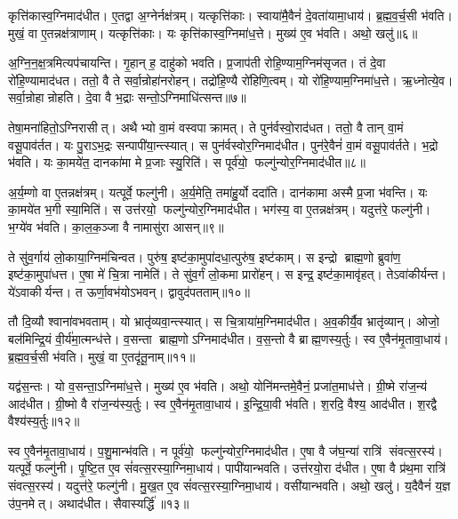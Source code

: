 कृत्ति॑कास्व॒ग्निमाद॑धीत। ए॒तद्वा अ॒ग्नेर्नक्ष॑त्रम्। यत्कृत्ति॑काः। स्वाया॑मै॒वैनं॑ दे॒वता॑यामा॒धाय॑। ब्र॒ह्म॒व॒र्च॒सी भ॑वति। मुखं॒ वा ए॒तन्नक्ष॑त्राणाम्। यत्कृत्ति॑काः। यः कृत्ति॑कास्व॒ग्निमा॑ध॒त्ते। मुख्य॑ ए॒व भ॑वति। अथो॒ खलु॑॥६॥

अ॒ग्नि॒न॒क्ष॒त्रमित्यप॑चायन्ति। गृ॒हान् ह॒ दाहु॑को भवति। प्र॒जाप॑ती रोहि॒ण्याम॒ग्निम॑सृजत। तं दे॒वा रो॑हि॒ण्यामाद॑धत। ततो॒ वै ते सर्वा॒न्रोहा॑नरोहन्। तद्रो॑हि॒ण्यै रो॑हिणि॒त्वम्। यो रो॑हि॒ण्याम॒ग्निमा॑ध॒त्ते। ऋ॒ध्नोत्ये॒व। सर्वा॒न्रोहान्रोहति। दे॒वा वै भ॒द्राः सन्तो॒ऽग्निमाधि॑त्सन्त॥७॥

तेषा॒मना॑हितो॒ऽग्निरासीत्। अथैभ्यो वा॒मं वस्वपाक्रामत्। ते पुन॑र्वस्वो॒राद॑धत। ततो॒ वै तान् वा॒मं वसू॒पाव॑र्तत। यः पु॒राऽभ॒द्रः सन्पापी॑या॒न्त्स्यात्। स पुन॑र्वस्वोर॒ग्निमाद॑धीत। पुन॑रे॒वैनं॑ वा॒मं वसू॒पाव॑र्तते। भ॒द्रो भ॑वति। यः का॒मये॑त॒ दानका॑मा मे प्र॒जाः स्यु॒रिति॑। स पूर्व॑यो॒ फल्गु॑न्योर॒ग्निमाद॑धीत॥८॥

अ॒र्य॒म्णो वा ए॒तन्नक्ष॑त्रम्। यत्पूर्वे॒ फल्गु॑नी। अ॒र्य॒मेति॒ तमा॑हु॒र्यो ददा॑ति। दान॑कामा अस्मै प्र॒जा भ॑वन्ति। यः का॒मये॑त भ॒गी स्या॒मिति॑। स उत्त॑रयो॒ फल्गु॑न्योर॒ग्निमाद॑धीत। भग॑स्य॒ वा ए॒तन्नक्ष॑त्रम्। यदुत्त॑रे॒ फल्गु॑नी। भ॒ग्ये॑व भ॑वति। का॒ल॒क॒ञ्जा वै नामासु॑रा आसन्॥९॥

ते सु॑व॒र्गाय॑ लो॒काया॒ग्निम॑चिन्वत। पुरु॑ष॒ इष्ट॑का॒मुपा॑दधा॒त्पुरु॑ष॒ इष्ट॑काम्। स इन्द्रो ब्राह्म॒णो ब्रुवा॑ण॒ इष्ट॑का॒मुपा॑धत्त। ए॒षा मे॑ चि॒त्रा नामेति॑। ते सु॑व॒र्गं लो॒कमा प्रारो॑हन्। स इन्द्र॒ इष्ट॑का॒मावृ॑हत्। तेऽवा॑कीर्यन्त। ये॑ऽवाकीर्यन्त। त ऊर्णा॒वभ॑योऽभवन्। द्वावुद॑पतताम्॥१०॥

तौ दि॒व्यौ श्वाना॑वभवताम्। यो भ्रातृ॑व्यवा॒न्त्स्यात्। स चि॒त्राया॑म॒ग्निमाद॑धीत। अ॒व॒कीर्यै॒व भ्रातृ॑व्यान्। ओजो॒ बल॑मिन्द्रि॒यं वी॒र्य॑मा॒त्मन्ध॑त्ते। व॒सन्ता ब्राह्म॒णोऽग्निमाद॑धीत। व॒स॒न्तो वै ब्राह्म॒णस्य॒र्तुः। स्व ए॒वैन॑मृ॒तावा॒धाय॑। ब्र॒ह्म॒व॒र्च॒सी भ॑वति। मुखं॒ वा ए॒तदृ॑तू॒नाम्॥११॥

यद्व॑स॒न्तः। यो व॒सन्ता॒ऽग्निमा॑ध॒त्ते। मुख्य॑ ए॒व भ॑वति। अथो॒ योनि॑मन्तमे॒वैनं॒ प्रजा॑त॒माध॑त्ते। ग्री॒ष्मे रा॑ज॒न्य॑ आद॑धीत। ग्री॒ष्मो वै रा॑ज॒न्य॑स्य॒र्तुः। स्व ए॒वैन॑मृ॒तावा॒धाय॑। इ॒न्द्रि॒या॒वी भ॑वति। श॒रदि॒ वैश्य॒ आद॑धीत। श॒रद्वै वैश्य॑स्य॒र्तुः॥१२॥

स्व ए॒वैन॑मृ॒तावा॒धाय॑। प॒शु॒मान्भ॑वति। न पूर्व॑यो॒ फल्गु॑न्योर॒ग्निमाद॑धीत। ए॒षा वै ज॑घ॒न्या॑ रात्रि॑ संवत्स॒रस्य॑। यत्पूर्वे॒ फल्गु॑नी। पृ॒ष्टि॒त ए॒व सं॑वत्स॒रस्या॒ग्निमा॒धाय॑। पापी॑यान्भवति। उत्त॑रयो॒रा द॑धीत। ए॒षा वै प्र॑थ॒मा रात्रि॑ संवत्स॒रस्य॑। यदुत्त॑रे॒ फल्गु॑नी। मु॒ख॒त ए॒व सं॑वत्स॒रस्या॒ग्निमा॒धाय॑। वसी॑यान्भवति। अथो॒ खलु॑। य॒दैवैनं॑ य॒ज्ञ उ॑प॒नमेत्। अथाद॑धीत। सैवास्यर्द्धि॑॥१३॥
\anuvakamend[खल्वा॑धित्सन्त॒ फल्गु॑न्योर॒ग्निमाद॑धीतासन्नपततामृतू॒नां वैश्य॑स्य॒र्तुरुत्त॑रे॒ फल्गु॑नी॒ षट्च॑]

